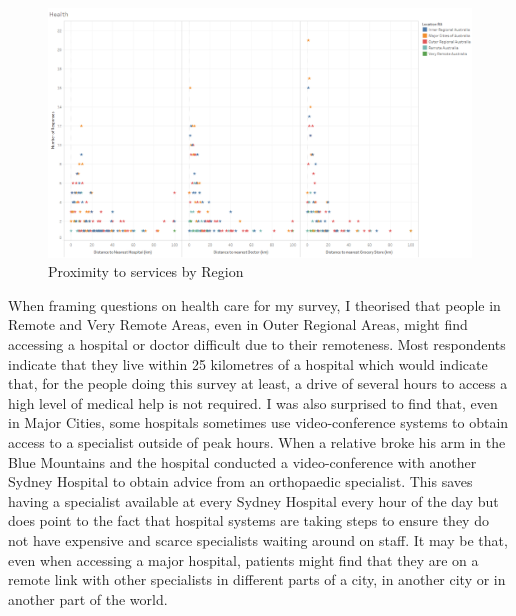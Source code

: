 \begin{figure}
\centering
\includegraphics[scale=0.4]{figures/HealthDistances.png} 
\caption{Proximity to services by Region} \label{fig:VC05HospitalProxRegions}
\end{figure}
When framing questions on health care for my survey, I theorised that people in Remote and Very Remote Areas, even in Outer Regional Areas, might find accessing a hospital or doctor difficult due to their remoteness. Most respondents indicate that they live within 25 kilometres of a hospital which would indicate that, for the people doing this survey at least, a drive of several hours to access a high level of medical help is not required. I was also surprised to find that, even in Major Cities, some hospitals sometimes use video-conference systems to obtain access to a specialist outside of peak hours. When a relative broke his arm in the Blue Mountains and the hospital conducted a video-conference with another Sydney Hospital to obtain advice from an orthopaedic specialist\cite{RefWorks:371}. This saves having a specialist available at every Sydney Hospital every hour of the day but does point to the fact that hospital systems are taking steps to ensure they do not have expensive and scarce specialists waiting around on staff. It may be that, even when accessing a major hospital, patients might find that they are on a remote link with other specialists in different parts of a city, in another city or in another part of the world. 

